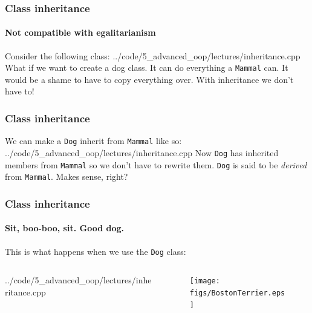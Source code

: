 \documentclass[handout]{beamer}
\begin{document}
\begin{frame}
  \frametitle{Class inheritance}
  \framesubtitle{Not compatible with egalitarianism}

	Consider the following class:
    {../code/5_advanced_oop/lectures/inheritance.cpp}
    \pause
  What if we want to create a dog class.  It can do everything a \texttt{Mammal} can.  It would be a shame to have to copy everything over.  With inheritance we don't have to!
\end{frame}

\begin{frame}
  \frametitle{Class inheritance}

  We can make a \texttt{Dog} inherit from \texttt{Mammal} like so:
    {../code/5_advanced_oop/lectures/inheritance.cpp}
  \pause
  Now \texttt{Dog} has inherited members from \texttt{Mammal} so we don't have to rewrite them.  \texttt{Dog} is said to be \textit{derived} from \texttt{Mammal}. Makes sense, right?
\end{frame}

\begin{frame}[fragile]
  \frametitle{Class inheritance}
  \framesubtitle{Sit, boo-boo, sit.  Good dog.}
  
  This is what happens when we use the \texttt{Dog} class:
  \begin{columns}[t]
    \begin{column}[T]{0.5\linewidth}
    		{../code/5_advanced_oop/lectures/inheritance.cpp}
    \end{column}
    \pause
  	\begin{column}[T]{0.48\linewidth}
			  \begin{figure}
			    \centering
					\texttt{[image: figs/BostonTerrier.eps]}
				\end{figure}
  	\end{column}
  \end{columns}

\end{frame}
\end{document}
